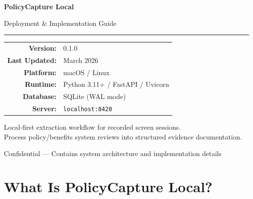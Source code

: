 \documentclass[12pt, a4paper]{article}
\begin{document}
\begin{titlepage}
    \centering
    \vspace*{2cm}

    {\Huge\bfseries\textcolor{dark}{PolicyCapture Local}\par}
    \vspace{0.5cm}
    {\LARGE\textcolor{primary}{Deployment \& Implementation Guide}\par}

    \vspace{1.5cm}
    \textcolor{primary}{\rule{0.6\textwidth}{2pt}}
    \vspace{1.5cm}

    {\large
    \begin{tabular}{rl}
        \textbf{Version:} & 0.1.0 \\
        \textbf{Last Updated:} & March 2026 \\
        \textbf{Platform:} & macOS / Linux \\
        \textbf{Runtime:} & Python 3.11+ / FastAPI / Uvicorn \\
        \textbf{Database:} & SQLite (WAL mode) \\
        \textbf{Server:} & \texttt{localhost:8420} \\
    \end{tabular}
    }

    \vspace{2cm}

    {\large\textcolor{commentgray}{Local-first extraction workflow for recorded screen sessions.\\
    Process policy/benefits system reviews into structured evidence documentation.}\par}

    \vfill
    {\small\textcolor{commentgray}{Confidential --- Contains system architecture and implementation details}\par}
\end{titlepage}

\newpage
\tableofcontents
\newpage

\section{What Is PolicyCapture Local?}
\end{document}
